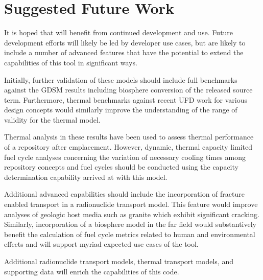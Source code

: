 \section{Suggested Future Work}
It is hoped that \Cyder will benefit from continued development and use. Future 
development efforts will likely be led by developer use cases, but are likely 
to include a number of advanced features that have the potential to extend the 
capabilities of this tool in significant ways. 

Initially, further validation of these models should include full benchmarks 
against the \gls{GDSM} results including biosphere conversion of the released 
source term.  Furthermore, thermal benchmarks against recent \gls{UFD} work for 
various design concepts would similarly improve the understanding of the range 
of validity for the thermal model. 

Thermal analysis in these results have been used to assess thermal performance 
of a repository after emplacement. However, dynamic, thermal capacity limited 
fuel cycle analyses concerning the variation of necessary cooling times among 
repository concepts and fuel cycles should be conducted using the capacity 
determination capability arrived at with this model.  

Additional advanced capabilities should include the incorporation of fracture 
enabled transport in a radionuclide transport model. This feature would improve 
analyses of geologic host media such as granite which exhibit significant 
cracking. Similarly, incorporation of a biosphere model in the far field would 
substantively benefit the calculation of fuel cycle metrics related to human and 
environmental effects and will support myriad expected use cases of the tool.

Additional radionuclide transport models, thermal transport models, and 
supporting data will enrich the capabilities of this code. 

